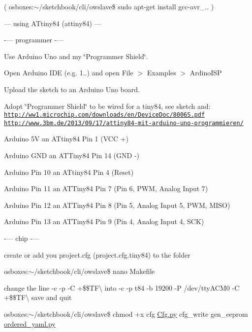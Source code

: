 ( osboxes\-:$\sim$/sketchbook/cli/owslave\$ sudo apt-\/get install gcc-\/avr\-\_.. )

--- using A\-Ttiny84 (attiny84) ---

-\/--- programmer -\/---

Use Arduino Uno and my \char`\"{}\-Programmer Shield\char`\"{}.

Open Arduino I\-D\-E (e.\-g. 1..) and open File $>$ Examples $>$ Ardino\-I\-S\-P

Upload the sketch to an Arduino Uno board.

Adopt \char`\"{}\-Programmer Shield\char`\"{} to be wired for a tiny84, see sketch and\-: \href{http://ww1.microchip.com/downloads/en/DeviceDoc/8006S.pdf}{\tt http\-://ww1.\-microchip.\-com/downloads/en/\-Device\-Doc/8006\-S.\-pdf} \href{http://www.3bm.de/2013/09/17/attiny84-mit-arduino-uno-programmieren/}{\tt http\-://www.\-3bm.\-de/2013/09/17/attiny84-\/mit-\/arduino-\/uno-\/programmieren/}


\begin{DoxyItemize}
\item Arduino 5\-V an A\-Ttiny84 Pin 1 (V\-C\-C +)
\item Arduino G\-N\-D an A\-T\-Tiny84 Pin 14 (G\-N\-D -\/)
\item Arduino Pin 10 an A\-Ttiny84 Pin 4 (Reset)
\item Arduino Pin 11 an A\-T\-Tiny84 Pin 7 (Pin 6, P\-W\-M, Analog Input 7)
\item Arduino Pin 12 an A\-T\-Tiny84 Pin 8 (Pin 5, Analog Input 5, P\-W\-M, M\-I\-S\-O)
\item Arduino Pin 13 an A\-T\-Tiny84 Pin 9 (Pin 4, Analog Input 4, S\-C\-K)
\end{DoxyItemize}

-\/--- chip -\/---

create or add you project.\-cfg (project.\-cfg.\-tiny84) to the folder

osboxes\-:$\sim$/sketchbook/cli/owslave\$ nano Makefile

change the line  -\/c  -\/p  -\/\-C +\$\$\-T\-F\textbackslash{} into  -\/c  -\/p t84 -\/b 19200 -\/\-P /dev/tty\-A\-C\-M0 -\/\-C +\$\$\-T\-F\textbackslash{} save and quit

osboxes\-:$\sim$/sketchbook/cli/owslave\$ chmod +x cfg \hyperlink{Cfg_8py}{Cfg.\-py} cfg\-\_\-write gen\-\_\-eeprom \hyperlink{ordered__yaml_8py}{ordered\-\_\-yaml.\-py}

